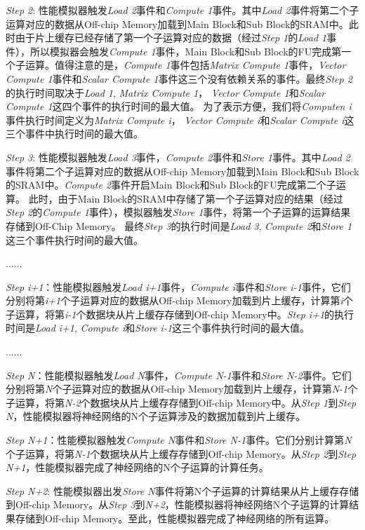 \emph{Step 2}: 性能模拟器触发\emph{Load 2}事件和\emph{Compute 1}事件。其中\emph{Load 2}事件将第二个子运算对应的数据从Off-chip Memory加载到Main Block和Sub Block的SRAM中。此时由于片上缓存已经存储了第一个子运算对应的数据（经过\emph{Step 1}的\emph{Load 1}事件），所以模拟器会触发\emph{Compute 1}事件，Main Block和Sub Block的FU完成第一个子运算。值得注意的是，\emph{Compute 1}事件包括\emph{Matrix Compute 1}事件，\emph{Vector Compute 1}事件和\emph{Scalar Compute 1}事件这三个没有依赖关系的事件。最终\emph{Step 2}的执行时间取决于\emph{Load 1}, \emph{Matrix Compute 1}， \emph{Vector Compute 1}和\emph{Scalar Compute 1}这四个事件的执行时间的最大值。
为了表示方便，我们将\emph{Computen i}事件执行时间定义为\emph{Matrix Compute i}， \emph{Vector Compute i}和\emph{Scalar Compute i}这三个事件中执行时间的最大值。

\emph{Step 3}: 性能模拟器触发\emph{Load 3}事件，\emph{Compute 2}事件和\emph{Store 1}事件。其中\emph{Load 2}事件将第二个子运算对应的数据从Off-chip Memory加载到Main Block和Sub Block的SRAM中。\emph{Compute 2}事件开启Main Block和Sub Block的FU完成第二个子运算。 此时，由于Main Block的SRAM中存储了第一个子运算对应的结果（经过\emph{Step 2}的\emph{Compute 1}事件），模拟器触发\emph{Store 1}事件，将第一个子运算的运算结果存储到Off-Chip Memory。
最终\emph{Step 3}的执行时间是\emph{Load 3}, \emph{Compute 2}和\emph{Store 1}这三个事件执行时间的最大值。

......

\emph{Step i+1}：性能模拟器触发\emph{Load i+1}事件，\emph{Compute i}事件和\emph{Store i-1}事件，它们分别将第\emph{i+1}个子运算对应的数据从Off-chip Memory加载到片上缓存，计算第\emph{i}个子运算，将第\emph{i-1}个数据块从片上缓存存储到Off-chip Memory中。\emph{Step i+1}的执行时间是\emph{Load i+1}, \emph{Compute i}和\emph{Store i-1}这三个事件执行时间的最大值。

......

\emph{Step N}：性能模拟器触发\emph{Load N}事件，\emph{Compute N-1}事件和\emph{Store N-2}事件。它们分别将第\emph{N}个子运算对应的数据从Off-chip Memory加载到片上缓存，计算第\emph{N-1}个子运算，将第\emph{N-2}个数据块从片上缓存存储到Off-chip Memory中。从\emph{Step 1}到\emph{Step N}，性能模拟器将神经网络的N个子运算涉及的数据加载到片上缓存。

\emph{Step N+1}：性能模拟器触发\emph{Compute N}事件和\emph{Store N-1}事件。它们分别计算第\emph{N}个子运算，将第\emph{N-1}个数据块从片上缓存存储到Off-chip Memory。从\emph{Step 2}到\emph{Step N+1}，性能模拟器完成了神经网络的N个子运算的计算任务。

\emph{Step N+2}: 性能模拟器出发\emph{Store N}事件将第N个子运算的计算结果从片上缓存存储到Off-chip Memory。从\emph{Step 3}到\emph{N+2}，性能模拟器将神经网络N个子运算的计算结果存储到Off-chip Memory。至此，性能模拟器完成了神经网络的所有运算。

